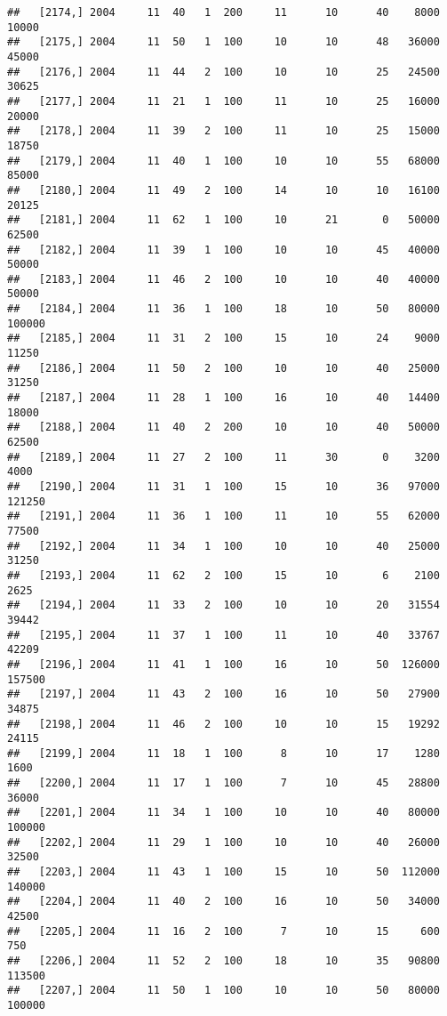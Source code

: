 \documentclass{article}\usepackage[]{graphicx}\usepackage[]{color}
\makeatletter
\newenvironment{kframe}{%
 \def\at@end@of@kframe{}%
 \ifinner\ifhmode%
  \def\at@end@of@kframe{\end{minipage}}%
  \begin{minipage}{\columnwidth}%
 \fi\fi%
 \def\FrameCommand##1{\hskip\@totalleftmargin \hskip-\fboxsep
 \colorbox{shadecolor}{##1}\hskip-\fboxsep
     \hskip-\linewidth \hskip-\@totalleftmargin \hskip\columnwidth}%
 \MakeFramed {\advance\hsize-\width
   \@totalleftmargin\z@ \linewidth\hsize
   \@setminipage}}%
 {\par\unskip\endMakeFramed%
 \at@end@of@kframe}
\newenvironment{knitrout}{}{} %
\makeatother
\begin{document}
\begin{knitrout}
\begin{kframe}
\begin{verbatim}
##   [2174,] 2004     11  40   1  200     11      10      40    8000   10000
##   [2175,] 2004     11  50   1  100     10      10      48   36000   45000
##   [2176,] 2004     11  44   2  100     10      10      25   24500   30625
##   [2177,] 2004     11  21   1  100     11      10      25   16000   20000
##   [2178,] 2004     11  39   2  100     11      10      25   15000   18750
##   [2179,] 2004     11  40   1  100     10      10      55   68000   85000
##   [2180,] 2004     11  49   2  100     14      10      10   16100   20125
##   [2181,] 2004     11  62   1  100     10      21       0   50000   62500
##   [2182,] 2004     11  39   1  100     10      10      45   40000   50000
##   [2183,] 2004     11  46   2  100     10      10      40   40000   50000
##   [2184,] 2004     11  36   1  100     18      10      50   80000  100000
##   [2185,] 2004     11  31   2  100     15      10      24    9000   11250
##   [2186,] 2004     11  50   2  100     10      10      40   25000   31250
##   [2187,] 2004     11  28   1  100     16      10      40   14400   18000
##   [2188,] 2004     11  40   2  200     10      10      40   50000   62500
##   [2189,] 2004     11  27   2  100     11      30       0    3200    4000
##   [2190,] 2004     11  31   1  100     15      10      36   97000  121250
##   [2191,] 2004     11  36   1  100     11      10      55   62000   77500
##   [2192,] 2004     11  34   1  100     10      10      40   25000   31250
##   [2193,] 2004     11  62   2  100     15      10       6    2100    2625
##   [2194,] 2004     11  33   2  100     10      10      20   31554   39442
##   [2195,] 2004     11  37   1  100     11      10      40   33767   42209
##   [2196,] 2004     11  41   1  100     16      10      50  126000  157500
##   [2197,] 2004     11  43   2  100     16      10      50   27900   34875
##   [2198,] 2004     11  46   2  100     10      10      15   19292   24115
##   [2199,] 2004     11  18   1  100      8      10      17    1280    1600
##   [2200,] 2004     11  17   1  100      7      10      45   28800   36000
##   [2201,] 2004     11  34   1  100     10      10      40   80000  100000
##   [2202,] 2004     11  29   1  100     10      10      40   26000   32500
##   [2203,] 2004     11  43   1  100     15      10      50  112000  140000
##   [2204,] 2004     11  40   2  100     16      10      50   34000   42500
##   [2205,] 2004     11  16   2  100      7      10      15     600     750
##   [2206,] 2004     11  52   2  100     18      10      35   90800  113500
##   [2207,] 2004     11  50   1  100     10      10      50   80000  100000

\end{verbatim}
\end{kframe}
\end{knitrout}
\end{document}
